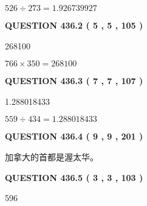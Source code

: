 \documentclass{ctexart}
\begin{document}
$ %
526 \div  %
273=   %
1.926739927$
 
 
  
\vspace{0.2in}
  
{\textbf{\Large{QUESTION
436.2 
 ( 5 , 5 , 105 )
}}}
  
  
 
 
\noindent{}

268100
 
 
 
 
\noindent{}

$ %
766 \times  %
350=   %
268100$
 
 
  
\vspace{0.2in}
  
{\textbf{\Large{QUESTION
436.3 
 ( 7 , 7 , 107 )
}}}
  
  
 
 
\noindent{}

1.288018433
 
 
 
 
\noindent{}

$ %
559 \div  %
434=   %
1.288018433$
 
 
  
\vspace{0.2in}
  
{\textbf{\Large{QUESTION
436.4 
 ( 9 , 9 , 201 )
}}}
  
  
 
 
\noindent{}
 
 
加拿大的首都是渥太华。
 
 
 
 
  
\vspace{0.2in}
  
{\textbf{\Large{QUESTION
436.5 
 ( 3 , 3 , 103 )
}}}
  
  
 
 
\noindent{}

596
 
 
 
\end{document}
